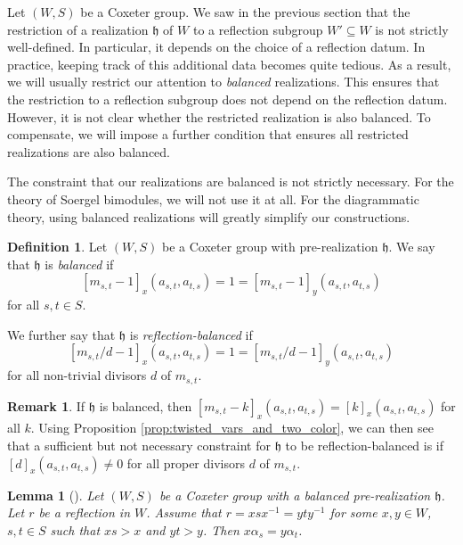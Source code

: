 \documentclass{amsart}
\newcommand{\fr}[1]{\mathfrak{#1}}
\newtheorem{lemma}[subsubsection]{Lemma}
\theoremstyle{definition}
\newtheorem{definition}[subsubsection]{Definition}
\newtheorem{remark}[subsubsection]{Remark}
\numberwithin{equation}{subsection}
\begin{document}
Let $(W,S)$ be a Coxeter group.
We saw in the previous section that the restriction of a realization $\fr{h}$ of $W$ to a reflection subgroup $W' \subseteq W$ is not strictly well-defined.
In particular, it depends on the choice of a reflection datum.
In practice, keeping track of this additional data becomes quite tedious. As a result, we will usually restrict our attention to \emph{balanced} realizations. 
This ensures that the restriction to a reflection subgroup does not depend on the reflection datum.
However, it is not clear whether the restricted realization is also balanced. To compensate, we will impose a further condition that ensures all restricted realizations are also balanced.
 
The constraint that our realizations are balanced is not strictly necessary. For the theory of Soergel bimodules, we will not use it at all.
For the diagrammatic theory, using balanced realizations will greatly simplify our constructions. 

\begin{definition}
    Let $(W,S)$ be a Coxeter group with pre-realization $\fr{h}$.
    We say that $\fr{h}$ is \emph{balanced} if 
    \[[m_{s,t} - 1]_x (a_{s,t}, a_{t,s}) = 1 = [m_{s,t} -1]_y (a_{s,t}, a_{t,s})\]
    for all $s,t \in S$.

    We further say that $\fr{h}$ is \emph{reflection-balanced} if
     \[[m_{s,t}/d - 1]_x (a_{s,t}, a_{t,s}) = 1 = [m_{s,t}/d -1]_y (a_{s,t}, a_{t,s})\]
     for all non-trivial divisors $d$ of $m_{s,t}$.  
\end{definition}

\begin{remark}
    If $\fr{h}$ is balanced, then $[m_{s,t} - k]_x (a_{s,t}, a_{t,s}) = [k]_x (a_{s,t}, a_{t,s})$ for all $k$. 
    Using Proposition \ref{prop:twisted_vars_and_two_color}, we can then see that a sufficient but not necessary constraint for $\fr{h}$ to be reflection-balanced is if $[d]_x (a_{s,t}, a_{t,s}) \neq 0$ for all proper divisors $d$ of $m_{s,t}$. 
\end{remark}

\begin{lemma}[{\cite[Lemma 1.2]{P25}}]\label{lem:well_defined_pos_roots_balancedness}
    Let $(W,S)$ be a Coxeter group with a balanced pre-realization $\fr{h}$.
    Let $r$ be a reflection in $W$.
    Assume that $r = xsx^{-1} = yty^{-1}$ for some $x,y\in W$, $s,t \in S$ such that $xs > x$ and $yt > y$. Then $x \alpha_s = y \alpha_t$.
\end{lemma}
\end{document}
